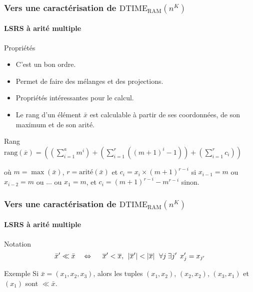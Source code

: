 \documentclass[10pt]{beamer}
\newcommand{\dtimeram}{\text{DTIME}_{\text{RAM}}\left( n^K \right)}
\newcommand{\rang}[1]{\text{rang}\left( #1 \right)}
\begin{document}
	
	\begin{frame}
		\frametitle{Vers une caractérisation de $\dtimeram$}
		\framesubtitle{LSRS à arité multiple}
		
		\begin{block}{Propriétés}
			\begin{itemize}
				\item 	C'est un bon ordre. %
				\item 	Permet de faire des mélanges et des projections. %
				\item 	Propriétés intéressantes pour le calcul. %
				\item 	Le rang d'un élément $\bar{x}$ est calculable à partir de ses coordonnées, de son maximum et de son arité.
			\end{itemize}
		\end{block}
		
		\pause 
		
		\begin{block}{Rang}
			$\rang{\overline{x}} = \left( \left( \sum_{i=1}^{a} m^i \right) + \left( \sum_{i=1}^{r} \left( \left(m+1\right)^i -1 \right) \right) + \left(\sum_{i=1}^{r} c_i \right) \right)$
			
			où $m = \max\left(\bar{x}\right)$, $r = \text{arité}(\bar{x})$ et $c_i = x_i \times \left(m+1\right)^{r-i}$ si $x_{i-1} = m$ ou $x_{i-2} = m$ ou $\dots$ ou $x_{1} = m$, et $c_i = \left(m+1\right)^{r-i}-m^{r-i}$ sinon. 
		\end{block}
		
	\end{frame}
	
	
	\begin{frame}
		\frametitle{Vers une caractérisation de $\dtimeram$}
		\framesubtitle{LSRS à arité multiple}
		
		\begin{block}{Notation}
			\[
				\bar{x}' \ll \bar{x} \ \ \ \Leftrightarrow \ \ \ \ \overline{x}' < \overline{x}, \:\: \left|\overline{x}'\right| < \left|\overline{x}\right| \:\: \forall j \: \exists j' \:\: x'_j = x_{j'}
			\]
		\end{block}
		
		\begin{block}{Exemple}
			Si $\bar{x} = \left( x_1, x_2, x_3 \right)$, alors les tuples $(x_1, x_2)$, $(x_2,x_2)$, $(x_3, x_1)$ et $(x_1)$ sont $\ll \bar{x}$.
		\end{block}
		
	\end{frame}
	
\end{document}
